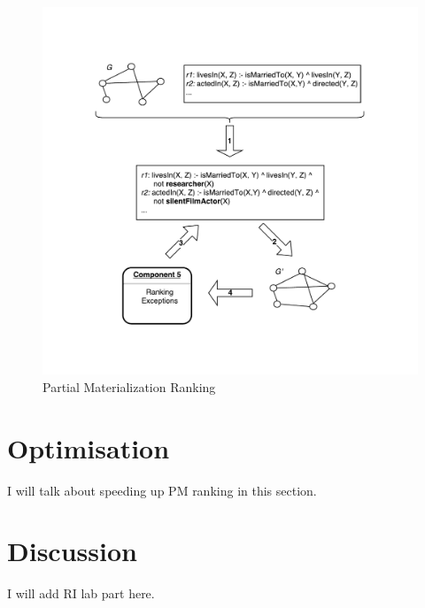 \begin{figure}[ht]
\centering
\includegraphics[width=1.0\textwidth]{figures/ranking}
\caption{Partial Materialization Ranking}
\label{pm_ranking}
\end{figure}

\section{Optimisation}

I will talk about speeding up PM ranking in this section.

\section{Discussion}

I will add RI lab part here.

